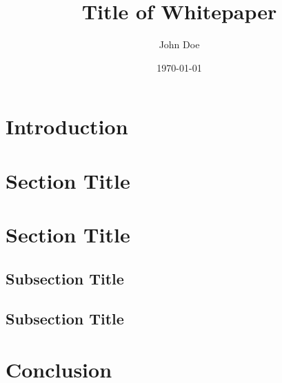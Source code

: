 \documentclass{article}
\title{Title of Whitepaper}
\date{\today}
\author{John Doe}
\begin{document}
\maketitle

\begin{abstract}
  \lipsum[1]
\end{abstract}

\section{Introduction}

\lipsum[2]

\section{Section Title}

\lipsum[1-2]

\section{Section Title}

\lipsum[1]

\subsection{Subsection Title}

\lipsum[1]

\subsection{Subsection Title}

\lipsum[1]

\section{Conclusion}

\lipsum [4-5]
\end{document}
